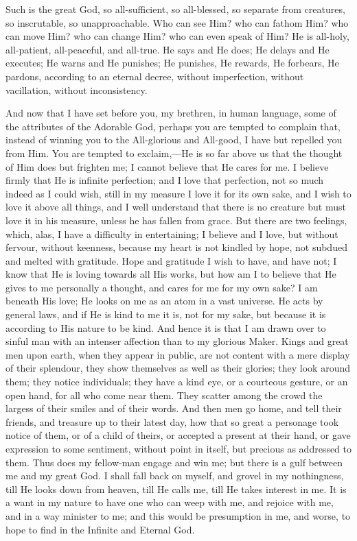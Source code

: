 Such is the great God, so all-sufficient, so all-blessed, so
separate from creatures, so inscrutable, so unapproachable. Who can
see Him? who can fathom Him? who can move Him? who can change Him? who
can even speak of Him? He is all-holy, all-patient, all-peaceful, and
all-true. He says and He does; He delays and He executes; He warns and
He punishes; He punishes, He rewards, He forbears, He pardons,
according to an eternal decree, without imperfection, without
vacillation, without inconsistency.

And now that I have set before you, my brethren, in human language,
some of the attributes of the Adorable God, perhaps you are tempted to
complain that, instead of winning you to the All-glorious and
All-good, I have but repelled you from Him. You are tempted to
exclaim,—He is so far above us that the thought of Him does but
frighten me; I cannot believe that He cares for me. I believe firmly
that He is infinite perfection; and I love that perfection, not so
much indeed as I could wish, still in my measure I love it for its own
sake, and I wish to love it above all things, and I well understand
that there is no creature but must love it in his measure, unless he
has fallen from grace. But there are two feelings, which, alas, I have
a difficulty in entertaining; I believe and I love, but without
fervour, without keenness, because my heart is not kindled by hope,
not subdued and melted with gratitude. Hope and gratitude I wish to
have, and have not; I know that He is loving towards all His works,
but how am I to believe that He gives to me personally a thought, and
cares for me for my own sake? I am beneath His love; He looks on me as
an atom in a vast universe. He acts by general laws, and if He is kind
to me it is, not for my sake, but because it is according to His
nature to be kind. And hence it is that I am drawn over to sinful man
with an intenser affection than to my glorious Maker. Kings and great
men upon earth, when they appear in public, are not content with a
mere display of their splendour, they show themselves as well as their
glories; they look around them; they notice individuals; they have a
kind eye, or a courteous gesture, or an open hand, for all who come
near them. They scatter among the crowd the largess of their smiles
and of their words. And then men go home, and tell their friends, and
treasure up to their latest day, how that so great a personage took
notice of them, or of a child of theirs, or accepted a present at
their hand, or gave expression to some sentiment, without point in
itself, but precious as addressed to them. Thus does my fellow-man
engage and win me; but there is a gulf between me and my great God. I
shall fall back on myself, and grovel in my nothingness, till He looks
down from heaven, till He calls me, till He takes interest in me. It
is a want in my nature to have one who can weep with me, and rejoice
with me, and in a way minister to me; and this would be presumption in
me, and worse, to hope to find in the Infinite and Eternal God.

